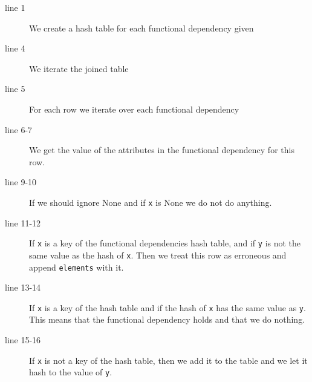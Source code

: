 \begin{description}
\item [line 1] We create a hash table for each functional dependency given
\item [line 4] We iterate the joined table
\item [line 5] For each row we iterate over each functional dependency
\item [line 6-7] We get the value of the attributes in the functional dependency for this row.
\item [line 9-10] If we should ignore None and if \texttt{x} is None we do not do anything.
\item [line 11-12] If \texttt{x} is a key of the functional dependencies hash table, and if \texttt{y} is not the same value as the hash of \texttt{x}.  Then we treat this row as erroneous and append \texttt{elements} with it.
\item [line 13-14] If \texttt{x} is a key of the hash table and if the hash of \texttt{x} has the same value as \texttt{y}. This means that the functional dependency holds and that we do nothing.
\item [line 15-16] If \texttt{x} is not a key of the hash table, then we add it to the table and we let it hash to the value of \texttt{y}.  
\end{description}

